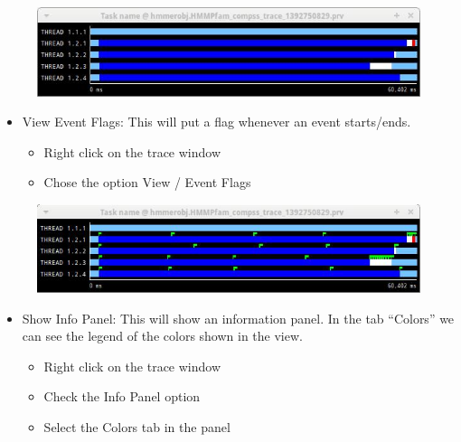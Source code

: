 \begin{figure}[ht!]
  \centering
    \includegraphics[width=1.0\textwidth]{./Sections/7_Tracing/Figures/3.jpeg}
\end{figure}

\begin{itemize} 
 \item View Event Flags: This will put a flag whenever an event starts/ends.
\begin{itemize}
 \item Right click on the trace window
 \item Chose the option View / Event Flags
\end{itemize}
\end{itemize}
 
\begin{figure}[ht!]
  \centering
    \includegraphics[width=1.0\textwidth]{./Sections/7_Tracing/Figures/4.jpeg}
\end{figure}

\begin{itemize}
 \item Show Info Panel: This will show an information panel. In the tab “Colors” we can see the legend of the colors shown in the view.
 \begin{itemize}
  \item Right click on the trace window
  \item Check the Info Panel option
  \item Select the Colors tab in the panel
 \end{itemize}
\end{itemize}


